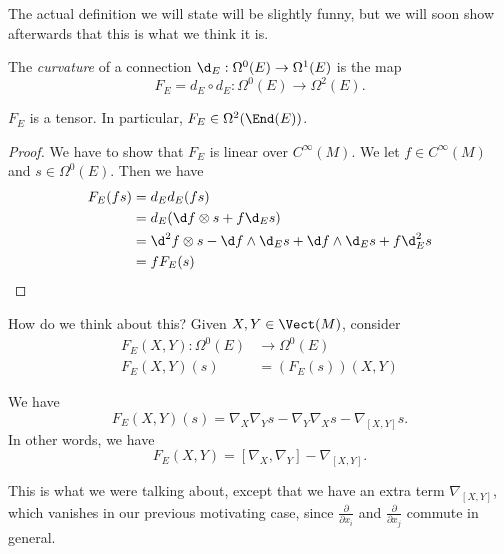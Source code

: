 \documentclass[a4paper]{article}
\begin{document}
The actual definition we will state will be slightly funny, but we will soon show afterwards that this is what we think it is.
\begin{defi}[Curvature]
  The \emph{curvature} of a connection $\d_E: \Omega^0(E) \to \Omega^1(E)$ is the map
  \[
    F_E = d_E \circ d_E: \Omega^0(E) \to \Omega^2(E).
  \]
\end{defi}

\begin{lemma}
  $F_E$ is a tensor. In particular, $F_E \in \Omega^2(\End(E))$.
\end{lemma}

\begin{proof}
  We have to show that $F_E$ is linear over $C^\infty(M)$. We let $f \in C^\infty(M)$ and $s \in \Omega^0(E)$. Then we have
  \begin{align*}
    F_E(fs) &= d_E d_E (fs)\\
    &= d_E(\d f \otimes s + f \d_E s)\\
    &= \d^2 f \otimes s - \d f \wedge \d_E s + \d f \wedge \d_E s + f \d_E^2 s\\
    &= f F_E(s)
  \end{align*}
\end{proof}

How do we think about this? Given $X, Y \in \Vect(M)$, consider
\begin{align*}
  F_E(X, Y) : \Omega^0(E) &\to \Omega^0(E)\\
  F_E(X, Y)(s) &= (F_E(s))(X, Y)
\end{align*}

\begin{lemma}
  We have
  \[
    F_E(X, Y)(s) = \nabla_X \nabla_Y s - \nabla_Y \nabla_X s - \nabla_{[X, Y]}s.
  \]
  In other words, we have
  \[
    F_E(X, Y) = [\nabla_X, \nabla_Y] - \nabla_{[X, Y]}.
  \]
\end{lemma}
This is what we were talking about, except that we have an extra term $\nabla_{[X, Y]}$, which vanishes in our previous motivating case, since $\frac{\partial}{\partial x_i}$ and $\frac{\partial}{\partial x_j}$ commute in general.
\end{document}
